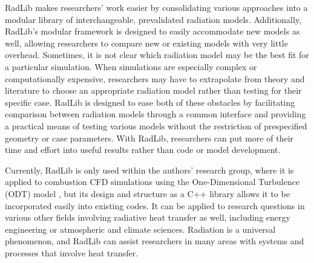 \documentclass[preprint,12pt, a4paper]{elsarticle}
\begin{document}
RadLib makes researchers' work easier by consolidating various approaches into a modular library of interchangeable, prevalidated radiation models. Additionally, RadLib's modular framework is designed to easily accommodate new models as well, allowing researchers to compare new or existing models with very little overhead. Sometimes, it is not clear which radiation model may be the best fit for a particular simulation. When simulations are especially complex or computationally expensive, researchers may have to extrapolate from theory and literature to choose an appropriate radiation model rather than testing for their specific case. RadLib is designed to ease both of these obstacles by facilitating comparison between radiation models through a common interface and providing a practical means of testing various models without the restriction of prespecified geometry or case parameters. With RadLib, researchers can put more of their time and effort into useful results rather than code or model development. 


Currently, RadLib is only used within the authors' research group, where it is applied to combustion CFD simulations using the One-Dimensional Turbulence (ODT) model \cite{Stephens_2020}, but its design and structure as a C++ library allows it to be incorporated easily into existing codes. It can be applied to  research questions in various other fields involving radiative heat transfer as well, including energy engineering or atmospheric and climate sciences. Radiation is a universal phenomenon, and RadLib can assist researchers in many areas with systems and processes that involve heat transfer. 

\end{document}
